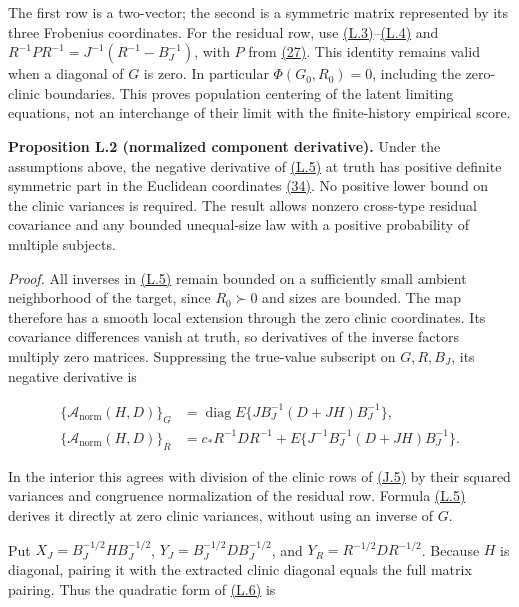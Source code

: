 \documentclass[11pt]{article}
\begin{document}
The first row is a two-vector; the second is a symmetric matrix represented by its three Frobenius coordinates. For the residual row, use \hyperref[eq:L.3]{(L.3)}--\hyperref[eq:L.4]{(L.4)} and
\(R^{-1}P R^{-1}=J^{-1}(R^{-1}-B_J^{-1})\), with \(P\) from \hyperref[eq:27]{(27)}. This identity remains valid when a diagonal of \(G\) is zero. In particular \(\Phi(G_0,R_0)=0\), including the zero-clinic boundaries. This proves population centering of the latent limiting equations, not an interchange of their limit with the finite-history empirical score.

\label{res:Proposition-L.2}
\textbf{Proposition L.2 (normalized component derivative).} Under the assumptions above, the negative derivative of \hyperref[eq:L.5]{(L.5)} at truth has positive definite symmetric part in the Euclidean coordinates \hyperref[eq:34]{(34)}. No positive lower bound on the clinic variances is required. The result allows nonzero cross-type residual covariance and any bounded unequal-size law with a positive probability of multiple subjects.

\emph{Proof.} All inverses in \hyperref[eq:L.5]{(L.5)} remain bounded on a sufficiently small ambient neighborhood of the target, since \(R_0\succ0\) and sizes are bounded. The map therefore has a smooth local extension through the zero clinic coordinates. Its covariance differences vanish at truth, so derivatives of the inverse factors multiply zero matrices. Suppressing the true-value subscript on \(G,R,B_J\), its negative derivative is

\begin{equation*}
\begin{aligned}
\{\mathcal A_{\mathrm{norm}}(H,D)\}_G
 &=\operatorname{diag}E\{J B_J^{-1}(D+JH)B_J^{-1}\},\\
\{\mathcal A_{\mathrm{norm}}(H,D)\}_R
 &=c_*R^{-1}DR^{-1}
 +E\{J^{-1}B_J^{-1}(D+JH)B_J^{-1}\}.
\end{aligned}\tag{L.6}\label{eq:L.6}
\end{equation*}

In the interior this agrees with division of the clinic rows of \hyperref[eq:J.5]{(J.5)} by their squared variances and congruence normalization of the residual row. Formula \hyperref[eq:L.5]{(L.5)} derives it directly at zero clinic variances, without using an inverse of \(G\).

Put \(X_J=B_J^{-1/2}HB_J^{-1/2}\), \(Y_J=B_J^{-1/2}DB_J^{-1/2}\), and \(Y_R=R^{-1/2}DR^{-1/2}\). Because \(H\) is diagonal, pairing it with the extracted clinic diagonal equals the full matrix pairing. Thus the quadratic form of \hyperref[eq:L.6]{(L.6)} is
\end{document}
